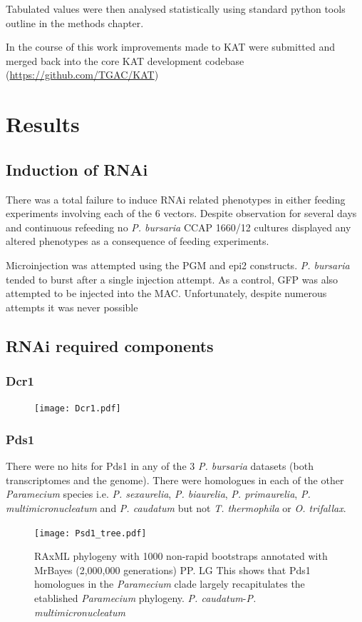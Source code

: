Tabulated values were then analysed statistically
using standard python tools outline in the methods chapter.

In the course of this work improvements made to KAT were submitted and merged
back into the core KAT development codebase (\url{https://github.com/TGAC/KAT})

\section{Results}

\subsection{Induction of RNAi}

There was a total failure to induce RNAi related phenotypes
in either feeding experiments involving each of the 6 vectors. 
Despite observation for several days and continuous refeeding
no \textit{P. bursaria} CCAP 1660/12 cultures displayed any
altered phenotypes as a consequence of feeding experiments. 

Microinjection was attempted using the PGM and epi2 constructs.
\textit{P. bursaria} tended to burst after a single injection attempt.
As a control, GFP was also attempted to be injected into the MAC.
Unfortunately, despite numerous attempts it was never possible


\subsection{RNAi required components}

\subsubsection{Dcr1}

\begin{figure}
    \texttt{[image: Dcr1.pdf]}
    \caption[RAxMl 1000 bootstraps MrBayes PP]{}
    \label{fig:dcr1}
\end{figure}


\subsubsection{Pds1}

There were no hits for Pds1 in any of the 3 \textit{P. bursaria} datasets 
(both transcriptomes and the genome).  
There were homologues in each of the other \textit{Paramecium} species
i.e. \textit{P. sexaurelia}, \textit{P. biaurelia}, \textit{P. primaurelia},
\textit{P. multimicronucleatum} and \textit{P. caudatum} but not
\textit{T. thermophila} or \textit{O. trifallax}.
\begin{figure}
    \texttt{[image: Psd1\_tree.pdf]}
    \caption[Phylogeny of Pds1 Sequences]{RAxML phylogeny with 1000 non-rapid
        bootstraps annotated with MrBayes (2,000,000 generations) PP. LG This shows that Pds1 homologues
in the \textit{Paramecium} clade largely recapitulates the etablished
\textit{Paramecium} phylogeny.  \textit{P. caudatum}-\textit{P. multimicronucleatum}}
\label{fig:pds1}
\end{figure}

